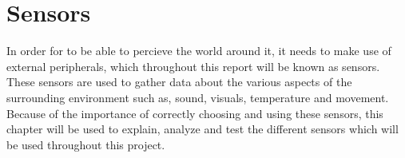\chapter{Sensors} \label{sensors}
In order for \name to be able to percieve the world around it,
it needs to make use of external peripherals, which throughout this report will
be known as sensors. These sensors are used to gather data about the various
aspects of the surrounding environment such as, sound, visuals, temperature and
movement. Because of the importance of correctly choosing and using these
sensors, this chapter will be used to explain, analyze and test the different
sensors which will be used throughout this project.

 


% 
% 
% 
% 